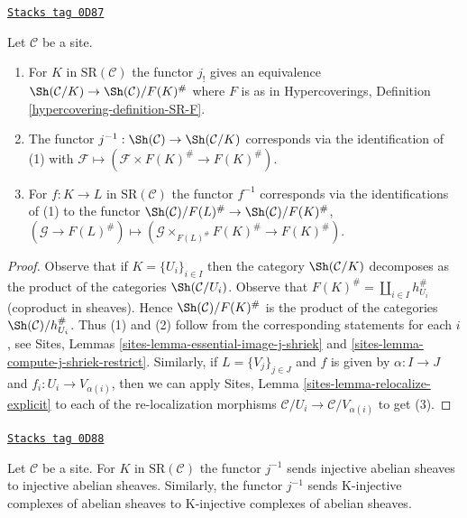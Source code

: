 \begin{lemma}
\label{spaces-simplicial-lemma-localize-compare}
\href{https://stacks.math.columbia.edu/tag/0D87}{\texttt{Stacks tag 0D87}}

Let $\mathcal{C}$ be a site.
\begin{enumerate}
\item For $K$ in $\text{SR}(\mathcal{C})$ the functor $j_!$
gives an equivalence $\Sh(\mathcal{C}/K) \to \Sh(\mathcal{C})/F(K)^\#$
where $F$ is as in
Hypercoverings, Definition \ref{hypercovering-definition-SR-F}.
\item The functor $j^{-1} : \Sh(\mathcal{C}) \to \Sh(\mathcal{C}/K)$
corresponds via the identification of (1) with
$\mathcal{F} \mapsto (\mathcal{F} \times F(K)^\# \to F(K)^\#)$.
\item For $f : K \to L$ in $\text{SR}(\mathcal{C})$ the functor
$f^{-1}$ corresponds via the identifications of (1) to the functor
$\Sh(\mathcal{C})/F(L)^\# \to \Sh(\mathcal{C})/F(K)^\#$,
$(\mathcal{G} \to F(L)^\#) \mapsto
(\mathcal{G} \times_{F(L)^\#} F(K)^\# \to F(K)^\#)$.
\end{enumerate}
\end{lemma}

\begin{proof}
Observe that if $K = \{U_i\}_{i \in I}$ then the category
$\Sh(\mathcal{C}/K)$ decomposes as the product of the categories
$\Sh(\mathcal{C}/U_i)$. Observe that
$F(K)^\# = \coprod_{i \in I} h_{U_i}^\#$ (coproduct in sheaves).
Hence $\Sh(\mathcal{C})/F(K)^\#$ is the product of the
categories $\Sh(\mathcal{C})/h_{U_i}^\#$.
Thus (1) and (2) follow from the corresponding
statements for each $i$, see
Sites, Lemmas \ref{sites-lemma-essential-image-j-shriek} and
\ref{sites-lemma-compute-j-shriek-restrict}.
Similarly, if $L = \{V_j\}_{j \in J}$ and $f$ is given
by $\alpha : I \to J$ and $f_i : U_i \to V_{\alpha(i)}$,
then we can apply
Sites, Lemma \ref{sites-lemma-relocalize-explicit}
to each of the re-localization morphisms
$\mathcal{C}/U_i \to \mathcal{C}/V_{\alpha(i)}$
to get (3).
\end{proof}

\begin{lemma}
\label{spaces-simplicial-lemma-localize-injective}
\href{https://stacks.math.columbia.edu/tag/0D88}{\texttt{Stacks tag 0D88}}

Let $\mathcal{C}$ be a site. For $K$ in $\text{SR}(\mathcal{C})$
the functor $j^{-1}$ sends injective abelian sheaves to injective
abelian sheaves. Similarly, the functor $j^{-1}$ sends K-injective
complexes of abelian sheaves to K-injective complexes of
abelian sheaves.
\end{lemma}

